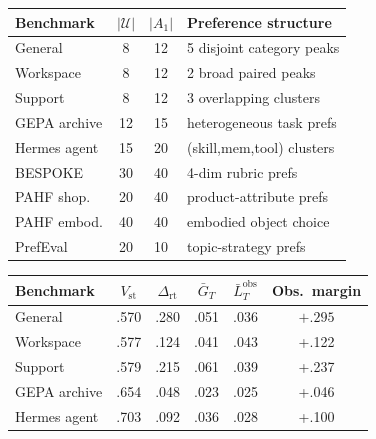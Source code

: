 \documentclass{article} %
\begin{document}
\begin{table}[t]
\centering
\small
\begin{minipage}[t]{0.48\textwidth}
\vspace{0pt}
\centering
\captionsetup{justification=raggedright,singlelinecheck=false}
\begingroup
\scriptsize
\setlength{\tabcolsep}{2.5pt}
\begin{tabular}{lccl}
\toprule
\textbf{Benchmark} & $|\mathcal{U}|$ & $|A_1|$ & Preference structure \\
\midrule
General       &  8 & 12 & 5 disjoint category peaks \\
Workspace     &  8 & 12 & 2 broad paired peaks \\
Support       &  8 & 12 & 3 overlapping clusters \\
GEPA archive  & 12 & 15 & heterogeneous task prefs \\
Hermes agent  & 15 & 20 & (skill,mem,tool) clusters \\
BESPOKE       & 30 & 40 & 4-dim rubric prefs \\
PAHF shop.    & 20 & 40 & product-attribute prefs \\
PAHF embod.   & 40 & 40 & embodied object choice \\
PrefEval      & 20 & 10 & topic-strategy prefs \\
\bottomrule
\end{tabular}
\endgroup
{}
\label{tab:envs}
\end{minipage}
\hfill
\begin{minipage}[t]{0.50\textwidth}
\vspace{0pt}
\centering
\captionsetup{justification=raggedright,singlelinecheck=false}
\begingroup
\scriptsize
\setlength{\tabcolsep}{2.5pt}
\begin{tabular}{lccccc}
\toprule
\textbf{Benchmark} & $V_{\mathrm{st}}$ & $\Delta_{\mathrm{rt}}$ & $\bar G_T$ & $\bar L_T^{\mathrm{obs}}$ & \textbf{Obs.\ margin} \\
\midrule
General       & .570 & .280 & .051 & .036 & $\mathbf{+.295}$ \\
Workspace     & .577 & .124 & .041 & .043 & +.122 \\
Support       & .579 & .215 & .061 & .039 & +.237 \\
GEPA archive  & .654 & .048 & .023 & .025 & +.046 \\
Hermes agent  & .703 & .092 & .036 & .028 & +.100 \\

\end{tabular}
\end{minipage}
\end{table}
\end{document}
